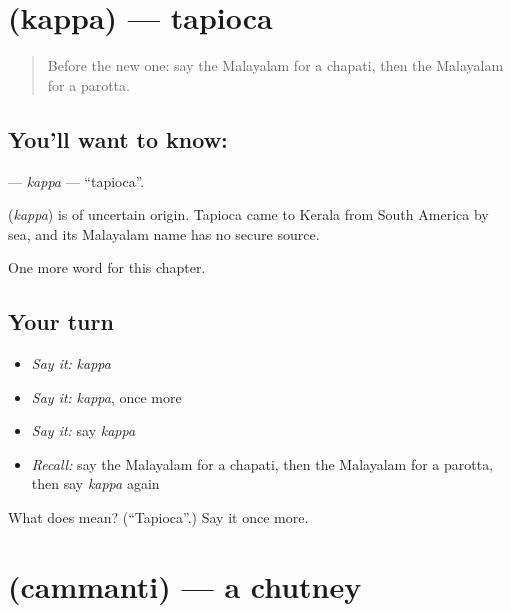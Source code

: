\section[\texorpdfstring{\ml{കപ്പ} (kappa)}{കപ്പ (kappa)}]{ (kappa) — tapioca}

\label{lesson:ML-C322-kappa}



\begin{quote}
Before the new one: say the Malayalam for a chapati, then the Malayalam for a parotta.
\end{quote}

\subsection*{You'll want to know: }
\textbf{} — \emph{kappa} — \textquotedblleft{}tapioca\textquotedblright{}.

\begin{cousinweb}
\textbf{} (\emph{kappa}) is of uncertain origin. Tapioca came to Kerala from South America by sea, and its Malayalam name has no secure source.
\end{cousinweb}

\begin{grammarlens}[title={What you've built}]
One more word for this chapter.
\end{grammarlens}

\subsection*{Your turn}
\begin{itemize}
\raggedright
  \item \emph{Say it:} \emph{kappa}
  \item \emph{Say it:} \emph{kappa}, once more
  \item \emph{Say it:} say \emph{kappa}
  \item \emph{Recall:} say the Malayalam for a chapati, then the Malayalam for a parotta, then say \emph{kappa} again
\end{itemize}

\begin{tcolorbox}[breakable,colback=teal!4,colframe=teal!35!black,title={Before you move on}]
What does  mean? (\textquotedblleft{}Tapioca\textquotedblright{}.) Say it once more.
\end{tcolorbox}
\section[\texorpdfstring{\ml{ചമ്മന്തി} (cammanti)}{ചമ്മന്തി (cammanti)}]{ (cammanti) — a chutney}

